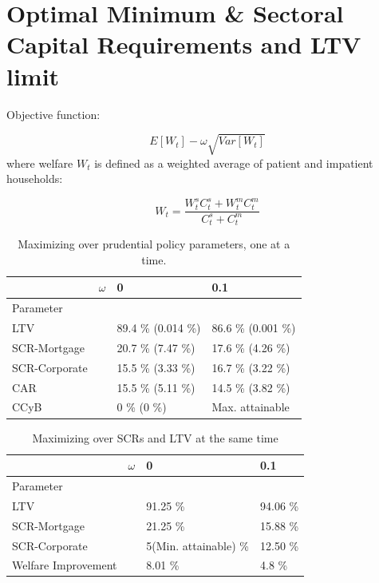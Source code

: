 \documentclass[12pt]{article}
\numberwithin{equation}{section}
\begin{document}
\section*{Optimal Minimum \& Sectoral Capital Requirements and LTV limit}

Objective function: 

$$ E[W_t] - \omega \sqrt{Var[W_t]} $$
where welfare $W_t$ is defined as a weighted average of patient and impatient households: 


$$ W_t = \frac{W^s_t C^s_t + W^m_t C^m_t}{C^s_t + C^m_t} $$

\begin{table}[h]

\caption{Maximizing over prudential policy parameters, one at a time.}
\begin{tabular}{l|l|l|l}

 & $\omega$ & 0 & 0.1   \\
 \hline
 \hline
Parameter & & &  \\
\hline
\hline
LTV &  & 89.4 \% (0.014 \%) & 86.6 \% (0.001 \%)  \\

SCR-Mortgage &  & 20.7 \% (7.47 \%) & 17.6 \% (4.26 \%) \\

SCR-Corporate & & 15.5 \% (3.33 \%) & 16.7 \% (3.22 \%) \\

CAR & & 15.5 \% (5.11 \%) & 14.5 \% (3.82 \%) \\

CCyB & & 0 \% (0 \%) & Max. attainable \\

\end{tabular}
\end{table}



\begin{table}[h]

\caption{Maximizing over SCRs and LTV at the same time}
\begin{tabular}{l|l|l|l}

 & $\omega$ & 0 & 0.1   \\
 \hline
 \hline
Parameter & & &  \\
\hline
\hline
LTV &  & 91.25 \%   &  94.06 \%  \\

SCR-Mortgage &  & 21.25 \%     & 15.88 \%   \\

SCR-Corporate & &  5(Min. attainable) \%  & 12.50 \%  \\

Welfare Improvement & & 8.01 \% & 4.8 \% \\

\end{tabular}
\end{table}
\end{document}

